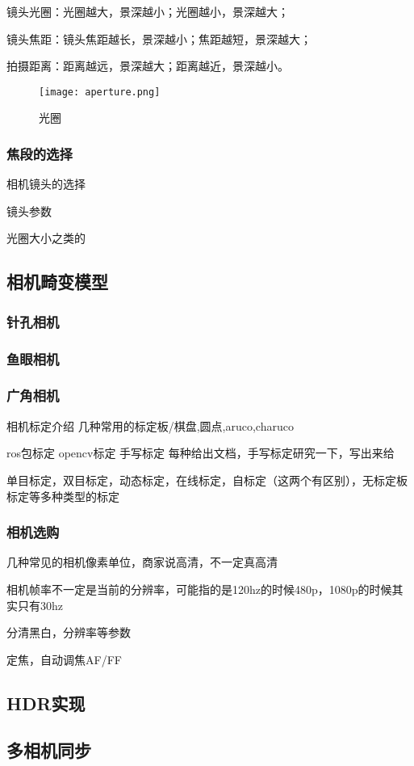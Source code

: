 镜头光圈：光圈越大，景深越小；光圈越小，景深越大；

镜头焦距：镜头焦距越长，景深越小；焦距越短，景深越大；

拍摄距离：距离越远，景深越大；距离越近，景深越小。
\begin{figure}[H]
    \centering
    \texttt{[image: aperture.png]}
    \caption{光圈} %
    \label{fig:光圈} %
\end{figure}
\subsubsection{焦段的选择}



相机镜头的选择

镜头参数

光圈大小之类的

\subsection{相机畸变模型}
\subsubsection{针孔相机}
\subsubsection{鱼眼相机}
\subsubsection{广角相机}

相机标定介绍
几种常用的标定板/棋盘,圆点,aruco,charuco

ros包标定 opencv标定 手写标定
每种给出文档，手写标定研究一下，写出来给

单目标定，双目标定，动态标定，在线标定，自标定（这两个有区别），无标定板标定等多种类型的标定

\subsubsection{相机选购}
几种常见的相机像素单位，商家说高清，不一定真高清

相机帧率不一定是当前的分辨率，可能指的是120hz的时候480p，1080p的时候其实只有30hz

分清黑白，分辨率等参数

定焦，自动调焦AF/FF

\subsection{HDR实现}
\subsection{多相机同步}
